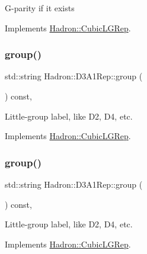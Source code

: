 G-\/parity if it exists 

Implements \mbox{\hyperlink{structHadron_1_1CubicLGRep_ace26f7b2d55e3a668a14cb9026da5231}{Hadron\+::\+Cubic\+L\+G\+Rep}}.

\mbox{\label{structHadron_1_1D3A1Rep_a03d8ecc85c64ea7c17e55196d73174f4}} 
\subsubsection{\texorpdfstring{group()}{group()}\hspace{0.1cm}{\footnotesize\ttfamily [1/5]}}
{\footnotesize\ttfamily std\+::string Hadron\+::\+D3\+A1\+Rep\+::group (\begin{DoxyParamCaption}{ }\end{DoxyParamCaption}) const\hspace{0.3cm}{\ttfamily [inline]}, {\ttfamily [virtual]}}

Little-\/group label, like D2, D4, etc. 

Implements \mbox{\hyperlink{structHadron_1_1CubicLGRep_a9bdb14b519a611d21379ed96a3a9eb41}{Hadron\+::\+Cubic\+L\+G\+Rep}}.

\mbox{\label{structHadron_1_1D3A1Rep_a03d8ecc85c64ea7c17e55196d73174f4}} 
\subsubsection{\texorpdfstring{group()}{group()}\hspace{0.1cm}{\footnotesize\ttfamily [2/5]}}
{\footnotesize\ttfamily std\+::string Hadron\+::\+D3\+A1\+Rep\+::group (\begin{DoxyParamCaption}{ }\end{DoxyParamCaption}) const\hspace{0.3cm}{\ttfamily [inline]}, {\ttfamily [virtual]}}

Little-\/group label, like D2, D4, etc. 

Implements \mbox{\hyperlink{structHadron_1_1CubicLGRep_a9bdb14b519a611d21379ed96a3a9eb41}{Hadron\+::\+Cubic\+L\+G\+Rep}}.

\mbox{\label{structHadron_1_1D3A1Rep_a03d8ecc85c64ea7c17e55196d73174f4}} 
